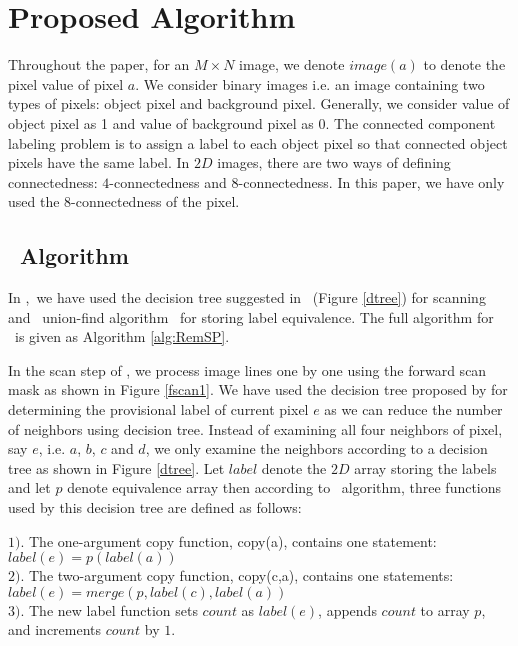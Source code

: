 \vspace{\sectionSpace}
\section{Proposed Algorithm}
\label{sec:proposed_algorithm}

Throughout the paper, for an $M \times N$ image, we denote $image(a)$ to denote the pixel value of pixel $a$.
We consider binary images i.e. an image containing two types of pixels:
object pixel and background pixel. Generally, we consider value of object pixel as 1 and value of background pixel as 0. The connected
component labeling problem is to assign a label to each object pixel so that connected object pixels have the same label.
In $2D$ images, there are two ways of defining connectedness: $4$-connectedness and $8$-connectedness. In this paper, we have 
only used the $8$-connectedness of the pixel.


\vspace{\sectionSpace}
\subsection{\nremsp\ Algorithm}

In \nremsp,\ we have used the decision tree suggested in \lrpc\ (Figure \ref{dtree})
for scanning and \rems\ union-find algorithm \remsp\ for storing label
equivalence.
The full algorithm for \nremsp\ is given as Algorithm \ref{alg:RemSP}.



In the scan step of \nremsp, we process image lines one by one using the
forward scan mask as shown in Figure \ref{fscan1}. We have used the decision tree proposed by \cite{Wu2009_LRPC} for 
determining the provisional label of current pixel $e$ as we can reduce the number of neighbors using decision tree. Instead of
examining all four neighbors of pixel, say $e$, i.e. $a$, $b$, $c$ and $d$, we only
examine the neighbors according to a decision tree as shown in Figure
\ref{dtree}.
 Let $label$ denote the $2D$ array storing the labels and let $p$ denote equivalence array 
 then according to \lrpc\ algorithm,
three functions used by this decision tree are defined as follows:

$1)$. The one-argument copy function, copy(a), contains one statement:
					$label(e) = p(label(a))$\\
$2)$. The two-argument copy function, copy(c,a), contains one statements:
				$label(e) = merge(p, label(c), label(a))$\\
$3)$. The new label function sets $count$ as $label(e)$, appends $count$ to array $p$, and increments $count$ by $1$.

